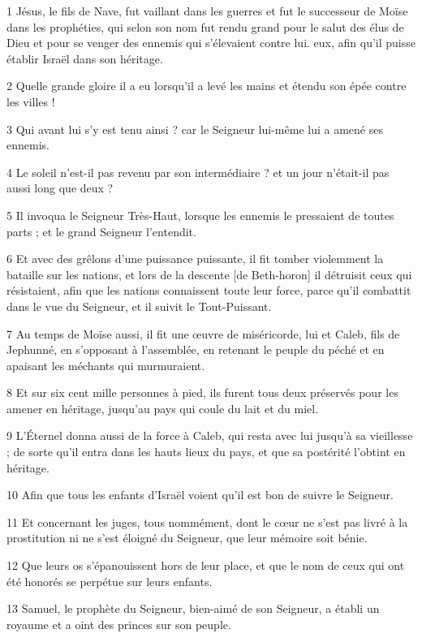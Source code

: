 
\par 1 Jésus, le fils de Nave, fut vaillant dans les guerres et fut le successeur de Moïse dans les prophéties, qui selon son nom fut rendu grand pour le salut des élus de Dieu et pour se venger des ennemis qui s'élevaient contre lui. eux, afin qu'il puisse établir Israël dans son héritage.
\par 2 Quelle grande gloire il a eu lorsqu'il a levé les mains et étendu son épée contre les villes !
\par 3 Qui avant lui s'y est tenu ainsi ? car le Seigneur lui-même lui a amené ses ennemis.
\par 4 Le soleil n'est-il pas revenu par son intermédiaire ? et un jour n'était-il pas aussi long que deux ?
\par 5 Il invoqua le Seigneur Très-Haut, lorsque les ennemis le pressaient de toutes parts ; et le grand Seigneur l'entendit.
\par 6 Et avec des grêlons d'une puissance puissante, il fit tomber violemment la bataille sur les nations, et lors de la descente [de Beth-horon] il détruisit ceux qui résistaient, afin que les nations connaissent toute leur force, parce qu'il combattit dans le vue du Seigneur, et il suivit le Tout-Puissant.
\par 7 Au temps de Moïse aussi, il fit une œuvre de miséricorde, lui et Caleb, fils de Jephunné, en s'opposant à l'assemblée, en retenant le peuple du péché et en apaisant les méchants qui murmuraient.
\par 8 Et sur six cent mille personnes à pied, ils furent tous deux préservés pour les amener en héritage, jusqu'au pays qui coule du lait et du miel.
\par 9 L'Éternel donna aussi de la force à Caleb, qui resta avec lui jusqu'à sa vieillesse ; de sorte qu'il entra dans les hauts lieux du pays, et que sa postérité l'obtint en héritage.
\par 10 Afin que tous les enfants d'Israël voient qu'il est bon de suivre le Seigneur.
\par 11 Et concernant les juges, tous nommément, dont le cœur ne s'est pas livré à la prostitution ni ne s'est éloigné du Seigneur, que leur mémoire soit bénie.
\par 12 Que leurs os s'épanouissent hors de leur place, et que le nom de ceux qui ont été honorés se perpétue sur leurs enfants.
\par 13 Samuel, le prophète du Seigneur, bien-aimé de son Seigneur, a établi un royaume et a oint des princes sur son peuple.
